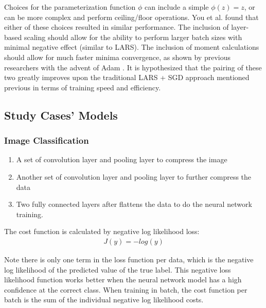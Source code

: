 Choices for the parameterization function $\phi$ can include a simple $\phi(z) = z$, or can be more complex and perform ceiling/floor operations. You et al. found that either of these choices resulted in similar performance\cite{You2020Large}. The inclusion of layer-based scaling should allow for the ability to perform larger batch sizes with minimal negative effect (similar to LARS). The inclusion of moment calculations should allow for much faster minima convergence, as shown by previous researchers with the advent of Adam \cite{adam}. It is hypothesized that the pairing of these two greatly improves upon the traditional LARS + SGD approach mentioned previous in terms of training speed and efficiency. 
\subsection{Study Cases' Models}

\subsubsection{Image Classification}

\begin{enumerate}[start=1,label={\bfseries\arabic*:}]
    \item A set of convolution layer and pooling layer to compress the image
    \item Another set of convolution layer and pooling layer to further compress the data
    \item Two fully connected layers after flattens the data to do the neural network training.
    \end{enumerate}
    

The cost function is calculated by negative log likelihood loss:
\begin{align*}
    J(y) = -log(y) 
\end{align*}

Note there is only one term in the loss function per data, which is the negative log likelihood of the predicted value of the true label. This negative loss likelihood function works better when the neural network model has a high confidence at the correct class. When training in batch, the cost function per batch is the sum of the individual negative log likelihood costs.

